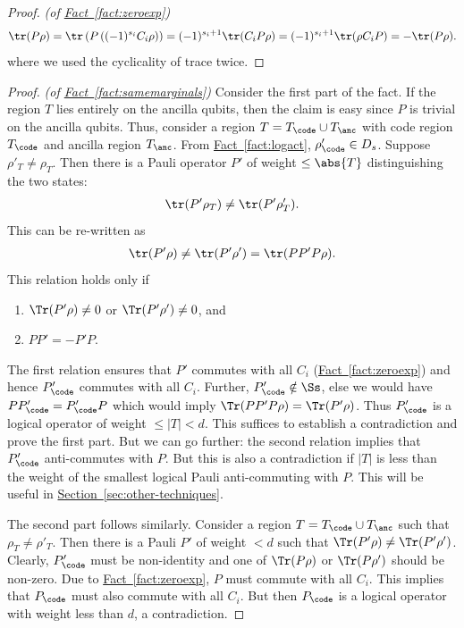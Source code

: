 \documentclass[11pt]{article}
\newcommand{\expref}[2]{\texorpdfstring{\hyperref[#2]{#1~\ref{#2}}}{#1~\ref{#2}}}
\begin{document}
\begin{proof}\textit{(of \expref{Fact}{fact:zeroexp})}
\begin{align}
    \tr(P \rho) = \tr \left( P \left( (-1)^{s_i} C_i \rho \right) \right) = (-1)^{s_i + 1} \tr(C_i P \rho) = (-1)^{s_i + 1} \tr(\rho C_iP) = - \tr(P \rho).
\end{align}
where we used the cyclicality of trace twice. 
\end{proof}

\begin{proof}\textit{(of \expref{Fact}{fact:samemarginals})}
Consider the first part of the fact. If the region $T$ lies entirely on the ancilla qubits, then the claim is easy since $P$ is trivial on the ancilla qubits.  Thus, consider a region $T=T_{\code} \cup T_{\anc}$ with code region $T_{\code}$ and ancilla region $T_{\anc}$. From \expref{Fact}{fact:logact}, $\rho'_{\code}\in D_s$. Suppose $\rho'_T\neq \rho_T$. Then there is a Pauli operator $P'$ of weight $\leq \abs{T}$ distinguishing the two states: 
\begin{align}
\tr(P' \rho_T)\neq \tr(P' \rho'_T).
\end{align}
This can be re-written as 
\begin{align}
\tr(P'\rho) \neq \tr(P' \rho') =  \tr(PP' P\rho).    
\end{align}
%
This relation holds only if 
\begin{enumerate}
    \item $\Tr(P' \rho)\neq 0$ or $\Tr(P' \rho')\neq 0$,  and 
    \item $PP'=-P'P$.
\end{enumerate}
The first relation ensures that $P'$ commutes with all $C_i$ (\expref{Fact}{fact:zeroexp}) and hence $P'_{\code}$ commutes with all $C_i$. Further, $P'_{\code}\notin \Ss$, else we would have $PP'_{\code}=P'_{\code}P$ which would imply $\Tr(PP' P\rho)=\Tr(P'\rho)$. Thus $P'_{\code}$ is a logical operator of weight $\leq |T|< d$. This suffices to establish a contradiction and prove the first part. But we can go further: the second relation implies that $P'_{\code}$ anti-commutes with $P$. But this is also a contradiction if $|T|$ is less than the weight of the smallest logical Pauli  anti-commuting with $P$. This will be useful in \expref{Section}{sec:other-techniques}. 

The second part follows similarly. Consider a region $T=T_{\code}\cup T_{\anc}$ such that $\rho_T \neq \rho'_T$. Then there is a Pauli $P'$ of weight $< d$ such that $\Tr(P'\rho)\neq \Tr(P'\rho')$. Clearly, $P'_{\code}$ must be non-identity and one of $\Tr(P\rho)$ or $\Tr(P\rho')$ should be non-zero. Due to \expref{Fact}{fact:zeroexp}, $P$ must commute with all $C_i$. This implies that $P_{\code}$ must also commute with all $C_i$. But then $P_{\code}$ is a logical operator with weight less than $d$, a contradiction.
\end{proof}
\end{document}
